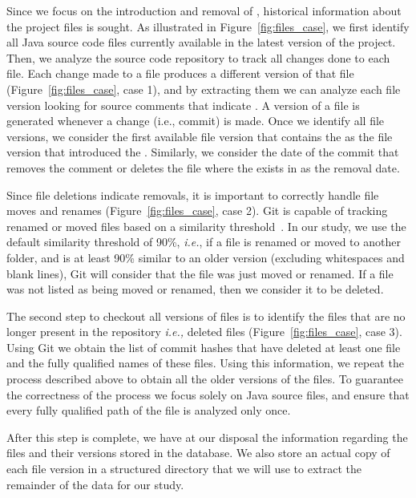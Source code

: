 Since we focus on the introduction and removal of \SATD, historical information about the project files is sought. As illustrated in Figure~\ref{fig:files_case}, we first identify all Java source code files currently available in the latest version of the project. Then, we analyze the source code repository to track all changes done to each file. Each change made to a file produces a different version of that file (Figure~\ref{fig:files_case}, case 1), and by extracting them we can analyze each file version looking for source comments that indicate \SATD. A version of a file is generated whenever a change (i.e., commit) is made. Once we identify all file versions, we consider the first available file version that contains the \SATD as the file version that introduced the \SATD. Similarly, we consider the date of the commit that removes the \SATD comment or deletes the file where the \SATD exists in as the removal date.

Since file deletions indicate \SATD removals, it is important to correctly handle file moves and renames (Figure~\ref{fig:files_case}, case 2). Git is capable of tracking renamed or moved files based on a similarity threshold~\cite{BirdMSR2009,HataIWPSE-EVOL2011}. In our study, we use the default similarity threshold of 90\%, \emph{i.e.}, if a file is renamed or moved to another folder, and is at least 90\% similar to an older version (excluding whitespaces and blank lines), Git will consider that the file was just moved or renamed. If a file was not listed as being moved or renamed, then we consider it to be deleted. 





The second step to checkout all versions of files is to identify the files that are no longer present in the repository  \textit{i.e.,} deleted files (Figure~\ref{fig:files_case}, case 3). Using Git we obtain the list of commit hashes that have deleted at least one file and the fully qualified names of these files. Using this information, we repeat the process described above to obtain all the older versions of the files. To guarantee the correctness of the process we focus solely on Java source files, and ensure that every fully qualified path of the file is analyzed only once. 



After this step is complete, we have at our disposal the information regarding the files and their versions stored in the database. We also store an actual copy of each file version in a structured directory that we will use to extract the remainder of the data for our study.

